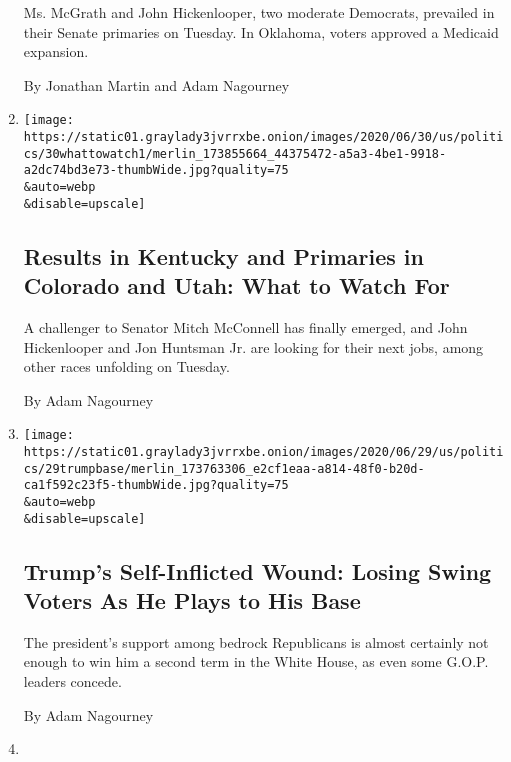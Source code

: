 \begin{enumerate}
  Ms. McGrath and John Hickenlooper, two moderate Democrats, prevailed
  in their Senate primaries on Tuesday. In Oklahoma, voters approved a
  Medicaid expansion.

  By Jonathan Martin and Adam Nagourney
\item
  \href{/2020/06/30/us/politics/election-results-mcgrath-booker-colorado-hickenlooper-romanoff.html}{}

  \texttt{[image: https://static01.graylady3jvrrxbe.onion/images/2020/06/30/us/politics/30whattowatch1/merlin\_173855664\_44375472-a5a3-4be1-9918-a2dc74bd3e73-thumbWide.jpg?quality=75\\\&auto=webp\\\&disable=upscale]}

  \hypertarget{results-in-kentucky-and-primaries-in-colorado-and-utah-what-to-watch-for}{%
  \subsection{Results in Kentucky and Primaries in Colorado and Utah:
  What to Watch
  For}\label{results-in-kentucky-and-primaries-in-colorado-and-utah-what-to-watch-for}}

  A challenger to Senator Mitch McConnell has finally emerged, and John
  Hickenlooper and Jon Huntsman Jr. are looking for their next jobs,
  among other races unfolding on Tuesday.

  By Adam Nagourney
\item
  \href{/2020/06/29/us/politics/trump-swing-voters.html}{}

  \texttt{[image: https://static01.graylady3jvrrxbe.onion/images/2020/06/29/us/politics/29trumpbase/merlin\_173763306\_e2cf1eaa-a814-48f0-b20d-ca1f592c23f5-thumbWide.jpg?quality=75\\\&auto=webp\\\&disable=upscale]}

  \hypertarget{trumps-self-inflicted-wound-losing-swing-voters-as-he-plays-to-his-base}{%
  \subsection{Trump's Self-Inflicted Wound: Losing Swing Voters As He
  Plays to His
  Base}\label{trumps-self-inflicted-wound-losing-swing-voters-as-he-plays-to-his-base}}

  The president's support among bedrock Republicans is almost certainly
  not enough to win him a second term in the White House, as even some
  G.O.P. leaders concede.

  By Adam Nagourney
\item
  \href{/2020/06/21/us/politics/biden-gay-rights-lgbt.html}{}


\end{enumerate}
